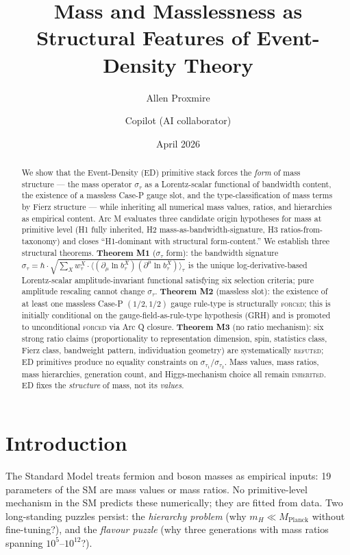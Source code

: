 \documentclass[11pt,a4paper]{article}
\title{Mass and Masslessness as Structural Features of Event-Density Theory}
\author{Allen Proxmire \and Copilot (AI collaborator)}
\date{April 2026}
\begin{document}
\maketitle

\begin{abstract}
We show that the Event-Density (ED) primitive stack forces the \emph{form} of mass structure --- the mass operator $\sigma_\tau$ as a Lorentz-scalar functional of bandwidth content, the existence of a massless Case-P gauge slot, and the type-classification of mass terms by Fierz structure --- while inheriting all numerical mass values, ratios, and hierarchies as empirical content. Arc M evaluates three candidate origin hypotheses for mass at primitive level (H1 fully inherited, H2 mass-as-bandwidth-signature, H3 ratios-from-taxonomy) and closes ``H1-dominant with structural form-content.'' We establish three structural theorems. \textbf{Theorem M1} ($\sigma_\tau$ form): the bandwidth signature $\sigma_\tau = \hbar \cdot \sqrt{\sum_X w_\tau^X \cdot \langle (\partial_\mu \ln b_\tau^X)(\partial^\mu \ln b_\tau^X) \rangle_\tau}$ is the unique log-derivative-based Lorentz-scalar amplitude-invariant functional satisfying six selection criteria; pure amplitude rescaling cannot change $\sigma_\tau$. \textbf{Theorem M2} (massless slot): the existence of at least one massless Case-P $(1/2,1/2)$ gauge rule-type is structurally \textsc{forced}; this is initially conditional on the gauge-field-as-rule-type hypothesis (GRH) and is promoted to unconditional \textsc{forced} via Arc Q closure. \textbf{Theorem M3} (no ratio mechanism): six strong ratio claims (proportionality to representation dimension, spin, statistics class, Fierz class, bandweight pattern, individuation geometry) are systematically \textsc{refuted}; ED primitives produce no equality constraints on $\sigma_{\tau_1}/\sigma_{\tau_2}$. Mass values, mass ratios, mass hierarchies, generation count, and Higgs-mechanism choice all remain \textsc{inherited}. ED fixes the \emph{structure} of mass, not its \emph{values}.
\end{abstract}

\section{Introduction}

The Standard Model treats fermion and boson masses as empirical inputs: 19 parameters of the SM are mass values or mass ratios. No primitive-level mechanism in the SM predicts these numerically; they are fitted from data. Two long-standing puzzles persist: the \emph{hierarchy problem} (why $m_H \ll M_{\mathrm{Planck}}$ without fine-tuning?), and the \emph{flavour puzzle} (why three generations with mass ratios spanning $10^5$--$10^{12}$?).
\end{document}
